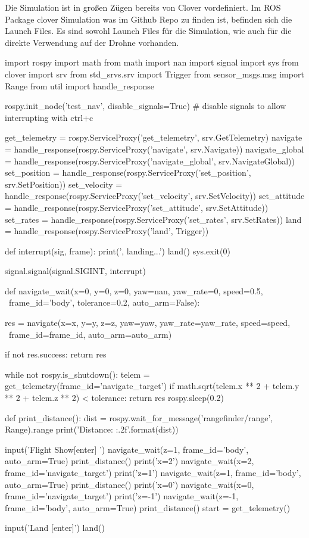 Die Simulation ist in großen Zügen bereits von Clover vordefiniert. Im ROS Package clover Simulation was im Github Repo \cite{coex_clover_git} zu finden ist, befinden sich die Launch Files. Es sind sowohl Launch Files für die Simulation, wie auch für die direkte Verwendung auf der Drohne vorhanden.\\



\begin{python}[breaklines=true, label=lst:steuerungDrohne, caption={ Pythonskript zum Steuern der Drohne}]
import rospy
import math
from math import nan
import signal
import sys
from clover import srv
from std_srvs.srv import Trigger
from sensor_msgs.msg import Range
from util import handle_response

rospy.init_node('test_nav', disable_signals=True) # disable signals to allow interrupting with ctrl+c

get_telemetry = rospy.ServiceProxy('get_telemetry', srv.GetTelemetry)
navigate = handle_response(rospy.ServiceProxy('navigate', srv.Navigate))
navigate_global = handle_response(rospy.ServiceProxy('navigate_global', srv.NavigateGlobal))
set_position = handle_response(rospy.ServiceProxy('set_position', srv.SetPosition))
set_velocity = handle_response(rospy.ServiceProxy('set_velocity', srv.SetVelocity))
set_attitude = handle_response(rospy.ServiceProxy('set_attitude', srv.SetAttitude))
set_rates = handle_response(rospy.ServiceProxy('set_rates', srv.SetRates))
land = handle_response(rospy.ServiceProxy('land', Trigger))

def interrupt(sig, frame):
    print('\nInterrupted, landing...')
    land()
    sys.exit(0)

signal.signal(signal.SIGINT, interrupt)

def navigate_wait(x=0, y=0, z=0, yaw=nan, yaw_rate=0, speed=0.5, \
        frame_id='body', tolerance=0.2, auto_arm=False):

    res = navigate(x=x, y=y, z=z, yaw=yaw, yaw_rate=yaw_rate, speed=speed, \
        frame_id=frame_id, auto_arm=auto_arm)

    if not res.success:
        return res

    while not rospy.is_shutdown():
        telem = get_telemetry(frame_id='navigate_target')
        if math.sqrt(telem.x ** 2 + telem.y ** 2 + telem.z ** 2) < tolerance:
            return res
        rospy.sleep(0.2)

def print_distance():
    dist = rospy.wait_for_message('rangefinder/range', Range).range
    print('Distance: {:.2f}'.format(dist))

input('Flight Show[enter] ')
navigate_wait(z=1, frame_id='body', auto_arm=True)
print_distance()
print('x=2')
navigate_wait(x=2, frame_id='navigate_target')
print('z=1')
navigate_wait(z=1, frame_id='body', auto_arm=True)
print_distance()
print('x=0')
navigate_wait(x=0, frame_id='navigate_target')
print('z=-1')
navigate_wait(z=-1, frame_id='body', auto_arm=True)
print_distance()
start = get_telemetry()

input('Land [enter]')
land()
\end{python}

